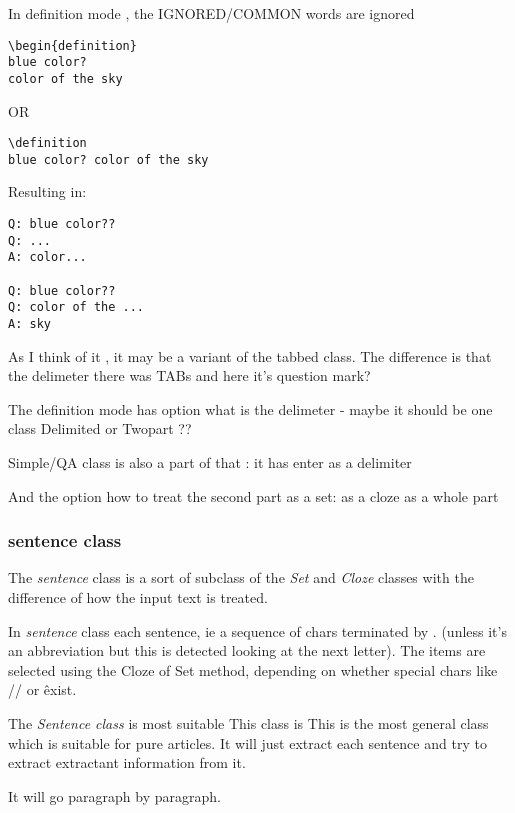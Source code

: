\documentclass[a4paper,11pt]{article}
\begin{document}
In definition mode , the IGNORED/COMMON words are ignored
\begin{verbatim}
\begin{definition}
blue color?
color of the sky
\end{verbatim}

OR

\begin{verbatim}
\definition
blue color? color of the sky
\end{verbatim}

Resulting in:
\begin{verbatim}
Q: blue color??
Q: ...
A: color...

Q: blue color??
Q: color of the ...
A: sky
\end{verbatim}


As I think of it , it may be a variant of the tabbed class.
The difference is that the delimeter there was TABs and here it's question mark?

The definition mode has option what is the delimeter - maybe it should be one
class Delimited or Twopart ??

Simple/QA class is also a part of that : it has enter as a delimiter

And the option how to treat the second part
as a set: %
as a cloze %
as a whole part %



\subsubsection{sentence class}

The \emph{sentence} class is a sort of subclass of the \emph{Set} and
\emph{Cloze} classes with the difference of how the input text is treated.

In \emph{sentence} class each sentence, ie a sequence of chars terminated by .
(unless it's an abbreviation but this is detected looking at the next letter).
The items are selected using the Cloze of Set method, depending on whether
special chars like // or \^ exist.


The \emph{Sentence class} is most suitable This class is
This is the most general class which is suitable for pure articles.  It will
just extract each sentence and try to extract extractant information from it.

It will go paragraph by paragraph.
\end{document}
